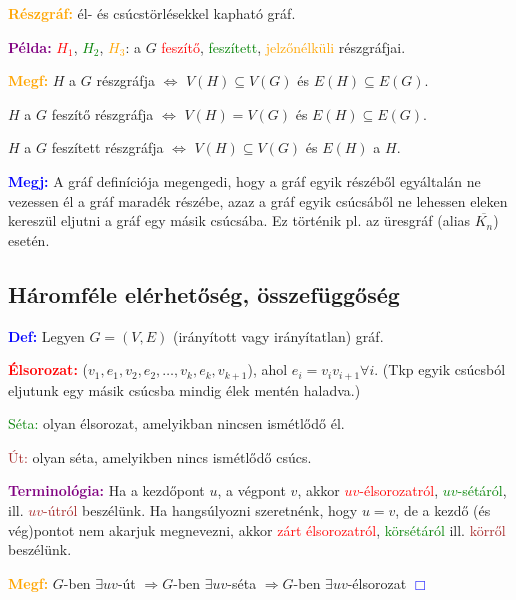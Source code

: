 \documentclass[../szamtud.tex]{subfiles}
\begin{document}
        \textcolor{orange}{\textbf{Részgráf:}} él- és csúcstörlésekkel kapható gráf.

        \textcolor{purple}{\textbf{Példa:}} \textcolor{red}{$H_1$}, \textcolor{green}{$H_2$}, \textcolor{orange}{$H_3$}: a $G$ \textcolor{red}{feszítő}, \textcolor{green}{feszített}, \textcolor{orange}{jelzőnélküli} részgráfjai.
    
        \textcolor{orange}{\textbf{Megf:}} $H$ a $G$ részgráfja $\Longleftrightarrow$ $V(H) \subseteq V(G)$ és $E(H) \subseteq E(G)$.

        $H$ a $G$ feszítő részgráfja $\Longleftrightarrow$ $V(H) = V(G)$ és $E(H) \subseteq E(G)$.

        $H$ a $G$ feszített részgráfja $\Longleftrightarrow$ $V(H) \subseteq V(G)$ és $E(H)$ a $H$.

        \textcolor{blue}{\textbf{Megj:}} A gráf definíciója megengedi, hogy a gráf egyik részéből egyáltalán ne vezessen él a gráf maradék részébe, azaz a gráf egyik csúcsáből ne lehessen eleken kereszül eljutni a gráf egy másik csúcsába. Ez történik pl. az üresgráf (alias $\overline{K_n}$) esetén.

    \subsection{Háromféle elérhetőség, összefüggőség}

        \textcolor{blue}{\textbf{Def:}} Legyen $G = (V,E)$ (irányított vagy irányítatlan) gráf.

        \textcolor{red}{\textbf{Élsorozat:}} ($v_1,e_1,v_2,e_2,\dots,v_k,e_k,v_{k+1}$), ahol $e_i=v_i v_{i+1}\forall i$. (Tkp egyik csúcsból eljutunk egy másik csúcsba mindig élek mentén haladva.)

        \textcolor{green}{Séta:} olyan élsorozat, amelyikban nincsen ismétlődő él.

        \textcolor{brown}{Út:} olyan séta, amelyikben nincs ismétlődő csúcs.

        \textcolor{purple}{\textbf{Terminológia:}} Ha a kezdőpont $u$, a végpont $v$, akkor \textcolor{red}{$uv$-élsorozatról}, \textcolor{green}{$uv$-sétáról}, ill. \textcolor{brown}{$uv$-útról} beszélünk. Ha hangsúlyozni szeretnénk, hogy $u = v$, de a kezdő (és vég)pontot nem akarjuk megnevezni, akkor \textcolor{red}{zárt élsorozatról}, \textcolor{green}{körsétáról} ill. \textcolor{brown}{körről} beszélünk.

        \textcolor{orange}{\textbf{Megf:}} $G$-ben $\exists uv$-út $\Rightarrow G$-ben $\exists uv$-séta $\Rightarrow G$-ben $\exists uv$-élsorozat \textcolor{blue}{$\Box$} 
\end{document}
